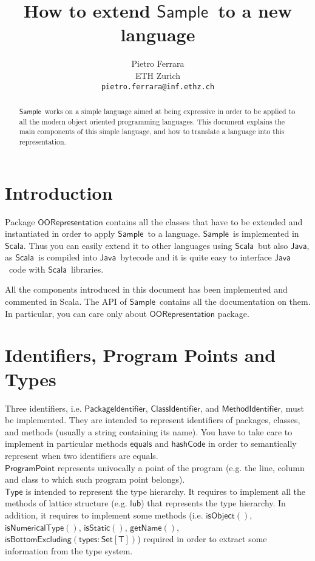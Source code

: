 \documentclass[11pt]{article}
\newcommand{\ScalaAnalyzer}{\ensuremath{\mathsf{Sample}}}
\newcommand{\statement}[1]{\ensuremath{\mathsf{#1}}}
\newcommand{\Java}{\ensuremath{\mathsf{Java}}}
\newcommand{\Scala}{\ensuremath{\mathsf{Scala}}}
\begin{document}
\title{How to extend \ScalaAnalyzer\ to a new language}

\author{
Pietro Ferrara\\
ETH Zurich\\
\texttt{pietro.ferrara@inf.ethz.ch}
}

\maketitle

\begin{abstract}
\ScalaAnalyzer\ works on a simple language aimed at being expressive in order to be applied to all the modern object oriented programming languages. This document explains the main components of this simple language, and how to translate a language into this representation.
\end{abstract}

\section{Introduction}
Package \statement{OORepresentation} contains all the classes that have to be extended and instantiated in order to apply \ScalaAnalyzer\ to a language. \ScalaAnalyzer\ is implemented in \Scala. Thus you can easily extend it to other languages using \Scala\ but also \Java, as \Scala\ is compiled into \Java\ bytecode and it is quite easy to interface \Java\ code with \Scala\ libraries.

All the components introduced in this document has been implemented and commented in Scala. The API of \ScalaAnalyzer\ contains all the documentation on them. In particular, you can care only about \statement{OORepresentation} package.

\section{Identifiers, Program Points and Types}
Three identifiers, i.e. \statement{PackageIdentifier}, \statement{ClassIdentifier}, and \statement{MethodIdentifier}, must be implemented. They are intended to represent identifiers of packages, classes, and methods (usually a string containing its name). You have to take care to implement in particular methods \statement{equals} and \statement{hashCode} in order to semantically represent when two identifiers are equals.\\
\statement{ProgramPoint} represents univocally a point of the program (e.g. the line, column and class to which such program point belongs).\\
\statement{Type} is intended to represent the type hierarchy. It requires to implement all the methods of lattice structure (e.g. \statement{lub}) that represents the type hierarchy. In addition, it requires to implement some methods (i.e. \statement{isObject()}, \statement{isNumericalType()}, \statement{isStatic()}, \statement{getName()}, \statement{isBottomExcluding(types : Set[T])}) required in order to extract some information from the type system.
\end{document}
